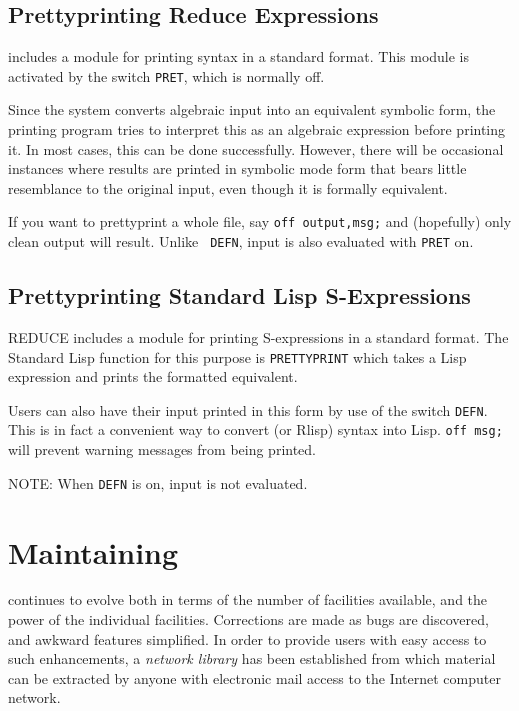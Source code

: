 \section{Prettyprinting Reduce Expressions}

{\REDUCE} includes a module for printing {\REDUCE} syntax in a standard
format.  This module is activated by the switch {\tt PRET},
 which is normally off.

Since the system converts algebraic input into an equivalent symbolic form,
the printing program tries to interpret this as an algebraic expression
before printing it. In most cases, this can be done successfully. However,
there will be occasional instances where results are printed in symbolic
mode form that bears little resemblance to the original input, even though
it is formally equivalent.

If you want to prettyprint a whole file, say {\tt off output,msg;}
 and (hopefully) only clean output will result.  Unlike {\tt
DEFN}, input is also evaluated with {\tt PRET}
 on.

\section{Prettyprinting Standard Lisp S-Expressions}

REDUCE includes a module for printing
S-expressions in a standard format.  The Standard Lisp function for this
purpose is {\tt PRETTYPRINT} which takes a Lisp
expression and prints the formatted equivalent.

Users can also have their {\REDUCE} input printed in this form by use of
the switch {\tt DEFN}. This is in fact a convenient way to
convert {\REDUCE} (or Rlisp) syntax into Lisp. {\tt off msg;} will prevent
warning messages from being printed.

NOTE: When {\tt DEFN} is on, input is not evaluated.

\chapter {Maintaining {\REDUCE}}

{\REDUCE} continues to evolve both in terms of the number of facilities
available, and the power of the individual facilities.  Corrections are
made as bugs are discovered, and awkward features simplified.  In order to
provide users with easy access to such enhancements, a {\em {\REDUCE}
network library\/} has been established from which material can be extracted
by anyone with electronic mail access to the Internet computer network.

